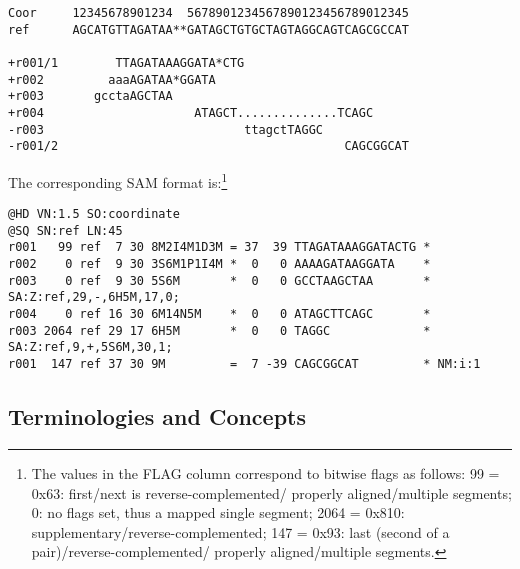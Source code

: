\documentclass[10pt]{article}
\begin{document}
\begin{framed}\small
\begin{verbatim}
Coor     12345678901234  5678901234567890123456789012345
ref      AGCATGTTAGATAA**GATAGCTGTGCTAGTAGGCAGTCAGCGCCAT

+r001/1        TTAGATAAAGGATA*CTG
+r002         aaaAGATAA*GGATA
+r003       gcctaAGCTAA
+r004                     ATAGCT..............TCAGC
-r003                            ttagctTAGGC
-r001/2                                        CAGCGGCAT
\end{verbatim}
\end{framed}
The corresponding SAM format is:\footnote{The values in the
{\sf FLAG} column correspond to bitwise flags as follows:
99 = 0x63: first\slash next is reverse-complemented\slash
properly aligned\slash multiple segments;
0: no flags set, thus a mapped single segment;
2064 = 0x810: supplementary\slash reverse-complemented;
147 = 0x93: last (second of a pair)\slash reverse-complemented\slash
properly aligned\slash multiple segments.}
\begin{framed}\small
\begin{verbatim}
@HD VN:1.5 SO:coordinate
@SQ SN:ref LN:45
r001   99 ref  7 30 8M2I4M1D3M = 37  39 TTAGATAAAGGATACTG *
r002    0 ref  9 30 3S6M1P1I4M *  0   0 AAAAGATAAGGATA    *
r003    0 ref  9 30 5S6M       *  0   0 GCCTAAGCTAA       * SA:Z:ref,29,-,6H5M,17,0;
r004    0 ref 16 30 6M14N5M    *  0   0 ATAGCTTCAGC       *
r003 2064 ref 29 17 6H5M       *  0   0 TAGGC             * SA:Z:ref,9,+,5S6M,30,1;
r001  147 ref 37 30 9M         =  7 -39 CAGCGGCAT         * NM:i:1
\end{verbatim}
\end{framed}

\subsection{Terminologies and Concepts}
\end{document}
